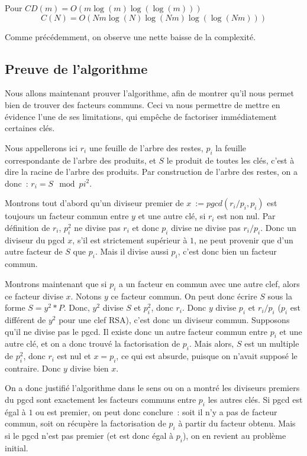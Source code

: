 \documentclass[a4paper,10pt]{article}
\begin{document}
  Pour $CD(m) = O(m\log(m)\log(\log(m)))$
  \[
   C(N) = O(Nm\log(N)\log(Nm)\log(\log(Nm)))
  \]
  
  Comme précédemment, on observe une nette baisse de la complexité.
  
  \subsection{Preuve de l'algorithme}
  Nous allons maintenant prouver l'algorithme, afin de montrer qu'il nous permet bien de trouver des facteurs communs.
  Ceci va nous permettre de mettre en évidence l'une de ses limitations, qui empêche de factoriser immédiatement certaines clés.
  
  Nous appellerons ici $r_i$ une feuille de l'arbre des restes, $p_i$ la feuille correspondante de l'arbre des produits, et $S$ le produit de toutes les clés, c'est à dire la racine de l'arbre des produits.
  Par construction de l'arbre des restes, on a donc~: $r_i = S \mod pi^2$.
  
  Montrons tout d'abord qu'un diviseur premier de $x~:= pgcd(r_i/p_i,p_i)$ est toujours un facteur commun entre $y$ et une autre clé, si $r_i$ est non nul. Par définition de $r_i$, $p_i^2$ ne divise pas $r_i$ et donc $p_i$ divise ne divise pas $r_i/p_i$. Donc un diviseur du pgcd $x$, s'il est strictement supérieur à $1$, ne peut provenir que d'un autre facteur de $S$ que $p_i$. Mais il divise aussi $p_i$, c'est donc bien un facteur commun.
  
  Montrons maintenant que si $p_i$ a un facteur en commun avec une autre clef, alors ce facteur divise $x$. Notons $y$ ce facteur commun. On peut donc écrire $S$ sous la forme $S = y^2*P$. Donc, $y^2$ divise $S$ et $p_i^2$, donc $r_i$.
  Donc $y$ divise $p_i$ et $r_i/p_i$ ($p_i$ est différent de $y^2$ pour une clef RSA), c'est donc un diviseur commun.
  Supposons qu'il ne divise pas le pgcd. Il existe donc un autre facteur commun entre $p_i$ et une autre clé, et on a donc trouvé la factorisation de $p_i$. Mais alors, $S$ est un multiple de $p_i^2$, donc $r_i$ est nul et $x = p_i$, ce qui est absurde, puisque on n'avait supposé le contraire. Donc $y$ divise bien $x$.
  
  On a donc justifié l'algorithme dans le sens ou on a montré les diviseurs premiers du pgcd sont exactement les facteurs communs entre $p_i$ les autres clés. Si pgcd est égal à $1$ ou est premier, on peut donc conclure~: soit il n'y a pas de facteur commun, soit on récupère la factorisation de $p_i$ à partir du facteur obtenu. Mais si le pgcd n'est pas premier (et est donc égal à $p_i$), on en revient au problème initial.
  
\end{document}
